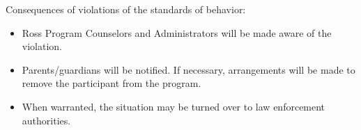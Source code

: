\documentclass{ross}
\begin{document}
Consequences of violations of the standards of behavior:
\begin{itemize}
\item Ross Program Counselors and Administrators will be made aware of
  the violation.
\item Parents/guardians will be notified. If necessary, arrangements
  will be made to remove the participant from the program.
\item When warranted, the situation may be turned over to law
  enforcement authorities.
\end{itemize}
\end{document}
